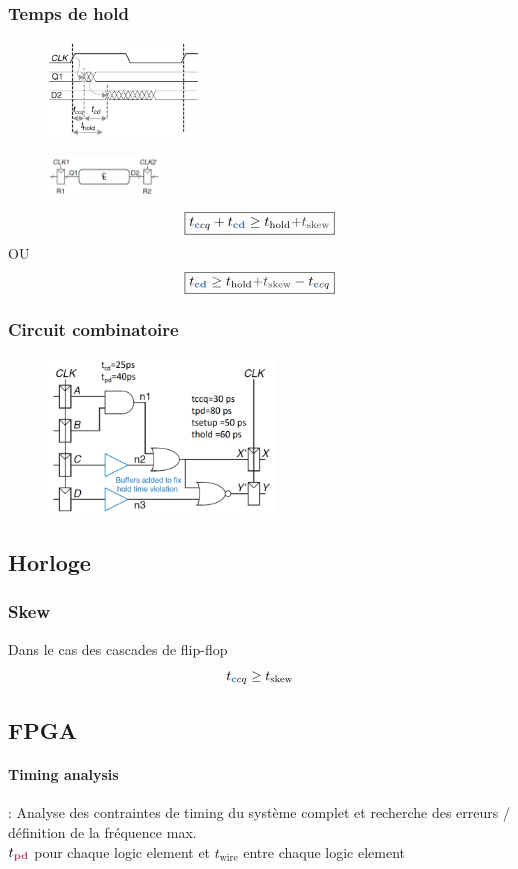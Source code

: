 \documentclass[resume]{subfiles}
\begin{document}
\begin{multicols}{3}
\subsubsection{Temps de hold}
\begin{figure}[H]
\centering
\includegraphics[width=4cm]{img_35.png}
\end{figure}
\begin{figure}[H]
\centering
\includegraphics[width=3.00cm]{img_34.png}
\end{figure}
$$\boxed{t_{\cdel cq}+t_{\cdelay} \geq t_{\text{hold}}\textcolor{darkgray}{+t_{\text{skew}}}}$$
OU
$$\boxed{t_{\cdelay} \geq t_{\text{hold}}\textcolor{darkgray}{+t_{\text{skew}}}-t_{\cdel cq}}$$
\subsubsection{Circuit combinatoire}
\begin{figure}[H]
\centering
\includegraphics[width=6.00cm]{img_36.png}
\end{figure}
\subsection{Horloge}
\subsubsection{Skew}
Dans le cas des cascades de flip-flop
$$t_{\cdel cq} \geq t_{\text{skew}}$$
\subsection{FPGA}
\paragraph{Timing analysis} : Analyse des contraintes de timing du système complet et recherche des erreurs / définition de la fréquence max.\\
$t_{\pdelay}$ pour chaque logic element et $t_{\text{wire}}$ entre chaque logic element

\end{multicols}
\end{document}
